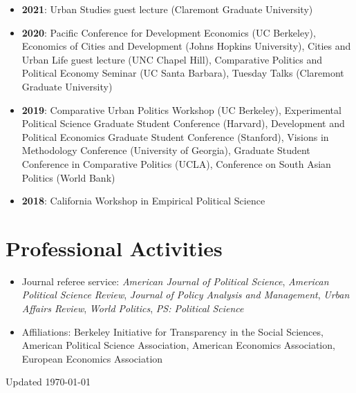\documentclass[11pt]{article}
\begin{document}
\begin{itemize}
\item[] \textbf{2021}: Urban Studies guest lecture (Claremont Graduate University)
\item[] \textbf{2020}: Pacific Conference for Development Economics (UC Berkeley), Economics of Cities and Development (Johns Hopkins University), Cities and Urban Life guest lecture (UNC Chapel Hill), Comparative Politics and Political Economy Seminar (UC Santa Barbara), Tuesday Talks (Claremont Graduate University)
\item[] \textbf{2019}: Comparative Urban Politics Workshop (UC Berkeley), Experimental Political Science Graduate Student Conference (Harvard), Development and Political Economics Graduate Student Conference (Stanford), Visions in Methodology Conference (University of Georgia), Graduate Student Conference in Comparative Politics (UCLA), Conference on South Asian Politics (World Bank)
\item[] \textbf{2018}: California Workshop in Empirical Political Science
\end{itemize}

\vspace{2mm}
\section*{Professional Activities}


\begin{itemize}	

\item[]Journal referee service: \textit{American Journal of Political Science}, \textit{American Political Science Review}, \textit{Journal of Policy Analysis and Management}, \textit{Urban Affairs Review}, \textit{World Politics}, \textit{PS: Political Science}
\item[]Affiliations: Berkeley Initiative for Transparency in the Social Sciences, American Political Science Association,  American Economics Association, European Economics Association
\end{itemize}


\vspace*{\fill}

\flushright Updated \today
\end{document}

